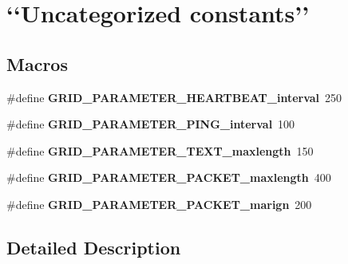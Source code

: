 \hypertarget{group__parameters}{\section{‘‘\-Uncategorized constants’’}
\label{group__parameters}
}
\subsection*{Macros}
\begin{DoxyCompactItemize}
\item 
\hypertarget{group__parameters_gaf2bcfc2fc90635f34a8ed4e3bf58620c}{\#define {\bfseries G\-R\-I\-D\-\_\-\-P\-A\-R\-A\-M\-E\-T\-E\-R\-\_\-\-H\-E\-A\-R\-T\-B\-E\-A\-T\-\_\-interval}~250}\label{group__parameters_gaf2bcfc2fc90635f34a8ed4e3bf58620c}

\item 
\hypertarget{group__parameters_ga352f199f1d900ea92a71defb20f98e66}{\#define {\bfseries G\-R\-I\-D\-\_\-\-P\-A\-R\-A\-M\-E\-T\-E\-R\-\_\-\-P\-I\-N\-G\-\_\-interval}~100}\label{group__parameters_ga352f199f1d900ea92a71defb20f98e66}

\item 
\hypertarget{group__parameters_gaaa0e139c57340eb21f7eef983f6ad2a2}{\#define {\bfseries G\-R\-I\-D\-\_\-\-P\-A\-R\-A\-M\-E\-T\-E\-R\-\_\-\-T\-E\-X\-T\-\_\-maxlength}~150}\label{group__parameters_gaaa0e139c57340eb21f7eef983f6ad2a2}

\item 
\hypertarget{group__parameters_gaa4a8bb1dc8b1c25fe8ad08bb884f0e9a}{\#define {\bfseries G\-R\-I\-D\-\_\-\-P\-A\-R\-A\-M\-E\-T\-E\-R\-\_\-\-P\-A\-C\-K\-E\-T\-\_\-maxlength}~400}\label{group__parameters_gaa4a8bb1dc8b1c25fe8ad08bb884f0e9a}

\item 
\hypertarget{group__parameters_ga86e59ef84010e26fdb66ad4c9af0f525}{\#define {\bfseries G\-R\-I\-D\-\_\-\-P\-A\-R\-A\-M\-E\-T\-E\-R\-\_\-\-P\-A\-C\-K\-E\-T\-\_\-marign}~200}\label{group__parameters_ga86e59ef84010e26fdb66ad4c9af0f525}

\end{DoxyCompactItemize}


\subsection{Detailed Description}
